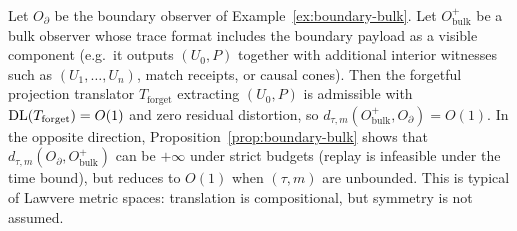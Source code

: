 \documentclass{aion}
\begin{document}
\begin{example}\label{ex:lawvere-boundary-bulk}
Let $O_{\partial}$ be the boundary observer of Example~\ref{ex:boundary-bulk}.
Let $O_{\mathrm{bulk}}^{+}$ be a bulk observer whose trace format includes the boundary payload as a visible component
(e.g.\ it outputs $(U_0,P)$ together with additional interior witnesses such as $(U_1,\ldots,U_n)$, match receipts, or causal cones).
Then the forgetful projection translator $T_{\mathrm{forget}}$ extracting $(U_0,P)$ is admissible with
$\operatorname{DL}(T_{\mathrm{forget}})=O(1)$ and zero residual distortion, so $d_{\tau,m}(O_{\mathrm{bulk}}^{+},O_{\partial})=O(1)$.
In the opposite direction, Proposition~\ref{prop:boundary-bulk} shows that
$d_{\tau,m}(O_{\partial},O_{\mathrm{bulk}}^{+})$ can be $+\infty$ under strict budgets (replay is infeasible under the time bound),
but reduces to $O(1)$ when $(\tau,m)$ are unbounded.
This is typical of Lawvere metric spaces: translation is compositional, but symmetry is not assumed.
\end{example}
\end{document}

